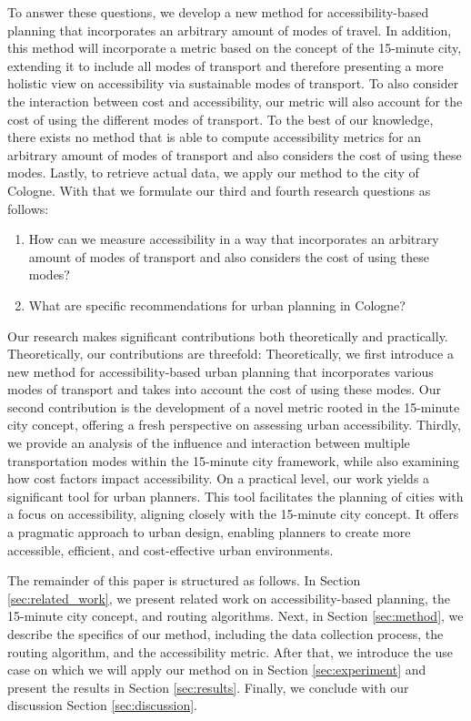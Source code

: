 To answer these questions, we develop a new method for accessibility-based planning that incorporates an arbitrary amount of modes of travel.
In addition, this method will incorporate a metric based on the concept of the 15-minute city, extending it to include all modes of transport and therefore presenting a more holistic view on accessibility via sustainable modes of transport.
To also consider the interaction between cost and accessibility, our metric will also account for the cost of using the different modes of transport.
To the best of our knowledge, there exists no method that is able to compute accessibility metrics for an arbitrary amount of modes of transport and also considers the cost of using these modes.
Lastly, to retrieve actual data, we apply our method to the city of Cologne.
With that we formulate our third and fourth research questions as follows:

\begin{enumerate}
  \renewcommand{\labelenumi}{RQ \theenumi.}
  \setcounter{enumi}{2}
  \item How can we measure accessibility in a way that incorporates an arbitrary amount of modes of transport and also considers the cost of using these modes?
  \label{rq:measure_accessibility}
  \item What are specific recommendations for urban planning in Cologne?
  \label{rq:recommendations}
\end{enumerate}

Our research makes significant contributions both theoretically and practically. Theoretically, our contributions are threefold:
Theoretically, we first introduce a new method for accessibility-based urban planning that incorporates various modes of transport and takes into account the cost of using these modes.
Our second contribution is the development of a novel metric rooted in the 15-minute city concept, offering a fresh perspective on assessing urban accessibility.
Thirdly, we provide an analysis of the influence and interaction between multiple transportation modes within the 15-minute city framework, while also examining how cost factors impact accessibility.
On a practical level, our work yields a significant tool for urban planners. 
This tool facilitates the planning of cities with a focus on accessibility, aligning closely with the 15-minute city concept. 
It offers a pragmatic approach to urban design, enabling planners to create more accessible, efficient, and cost-effective urban environments.

The remainder of this paper is structured as follows.
In Section \ref{sec:related_work}, we present related work on accessibility-based planning, the 15-minute city concept, and routing algorithms.
Next, in Section \ref{sec:method}, we describe the specifics of our method, including the data collection process, the routing algorithm, and the accessibility metric.
After that, we introduce the use case on which we will apply our method on in Section \ref{sec:experiment} and present the results in Section \ref{sec:results}.
Finally, we conclude with our discussion Section \ref{sec:discussion}.

